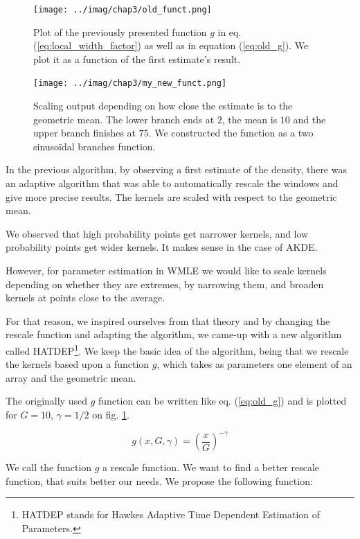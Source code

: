 \documentclass[11pt]{book}
\begin{document}
\begin{figure}
\centering
\texttt{[image: ../imag/chap3/old\_funct.png]}
\caption{Plot of the previously presented function $g$ in eq. (\ref{eq:local_width_factor}) as well as in equation (\ref{eq:old_g}). We plot it as a function of the first estimate's result.}
\label{fig:old_scaling}
\end{figure}


\begin{figure}
\centering
\texttt{[image: ../imag/chap3/my\_new\_funct.png]}
\caption{Scaling output depending on how close the estimate is to the geometric mean. The lower branch ends at $2$, the mean is $10$ and the upper branch finishes at $75$. We constructed the function as a two sinusoïdal branches function.}
\label{fig:new_scaling}
\end{figure}

In the previous algorithm, by observing a first estimate of the density, there was an adaptive algorithm that was able to automatically rescale the windows and give more precise results. The kernels are scaled with respect to the geometric mean. 

We observed that high probability points get narrower kernels, and low probability points get wider kernels. It makes sense in the case of AKDE. 

However, for parameter estimation in WMLE we would like to scale kernels depending on whether they are extremes, by narrowing them, and broaden kernels at points close to the average.

For that reason, we inspired ourselves from that theory and by changing the rescale function and adapting the algorithm, we came-up with a new algorithm called HATDEP\footnote{HATDEP stands for Hawkes Adaptive Time Dependent Estimation of Parameters.}. We keep the basic idea of the algorithm, being that we rescale the kernels based upon a function $g$, which takes as parameters one element of an array and the geometric mean. 

The originally used $g$ function can be written like eq. (\ref{eq:old_g}) and is plotted for $G = 10$, $\gamma = 1/2$ on fig. \ref{fig:old_scaling}. 

\begin{equation}
\label{eq:old_g}
g(x,G, \gamma) =  \left ( \frac x G \right ) ^{-\gamma}
\end{equation}

We call the function $g$ a rescale function. We want to find a better rescale function, that suits better our needs. We propose the following function:
\end{document}

